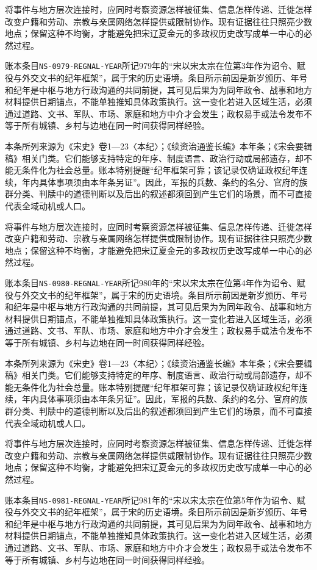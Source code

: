 将事件与地方层次连接时，应同时考察资源怎样被征集、信息怎样传递、迁徙怎样改变户籍和劳动、宗教与亲属网络怎样提供或限制协作。现有证据往往只照亮少数地点；保留这种不均衡，才能避免把宋辽夏金元的多政权历史改写成单一中心的必然过程。

账本条目\texttt{NS-0979-REGNAL-YEAR}所记979年的“宋以宋太宗在位第3年作为诏令、赋役与外交文书的纪年框架”，属于宋的历史语境。条目所示前因是新岁颁历、年号和纪年是中枢与地方行政沟通的共同前提，其可见后果为为同年政令、战事和地方材料提供日期锚点，不能单独推知具体政策执行。这一变化若进入区域生活，必须通过道路、文书、军队、市场、家庭和地方中介才会发生；政权易手或法令发布不等于所有城镇、乡村与边地在同一时间获得同样经验。

本条所列来源为《宋史》卷1—23〈本纪〉；《续资治通鉴长编》本年条；《宋会要辑稿》相关门类。它们能够支持特定的年序、制度语言、政治行动或局部遗存，却不能无条件化为社会总量。账本特别提醒“纪年框架可靠；该记录仅确证政权纪年连续，年内具体事项须由本年条另证”。因此，军报的兵数、条约的名分、官府的族群分类、判牍中的道德判断以及后出的叙述都须回到产生它们的场景，而不可直接代表全域动机或人口。

将事件与地方层次连接时，应同时考察资源怎样被征集、信息怎样传递、迁徙怎样改变户籍和劳动、宗教与亲属网络怎样提供或限制协作。现有证据往往只照亮少数地点；保留这种不均衡，才能避免把宋辽夏金元的多政权历史改写成单一中心的必然过程。

账本条目\texttt{NS-0980-REGNAL-YEAR}所记980年的“宋以宋太宗在位第4年作为诏令、赋役与外交文书的纪年框架”，属于宋的历史语境。条目所示前因是新岁颁历、年号和纪年是中枢与地方行政沟通的共同前提，其可见后果为为同年政令、战事和地方材料提供日期锚点，不能单独推知具体政策执行。这一变化若进入区域生活，必须通过道路、文书、军队、市场、家庭和地方中介才会发生；政权易手或法令发布不等于所有城镇、乡村与边地在同一时间获得同样经验。

本条所列来源为《宋史》卷1—23〈本纪〉；《续资治通鉴长编》本年条；《宋会要辑稿》相关门类。它们能够支持特定的年序、制度语言、政治行动或局部遗存，却不能无条件化为社会总量。账本特别提醒“纪年框架可靠；该记录仅确证政权纪年连续，年内具体事项须由本年条另证”。因此，军报的兵数、条约的名分、官府的族群分类、判牍中的道德判断以及后出的叙述都须回到产生它们的场景，而不可直接代表全域动机或人口。

将事件与地方层次连接时，应同时考察资源怎样被征集、信息怎样传递、迁徙怎样改变户籍和劳动、宗教与亲属网络怎样提供或限制协作。现有证据往往只照亮少数地点；保留这种不均衡，才能避免把宋辽夏金元的多政权历史改写成单一中心的必然过程。

账本条目\texttt{NS-0981-REGNAL-YEAR}所记981年的“宋以宋太宗在位第5年作为诏令、赋役与外交文书的纪年框架”，属于宋的历史语境。条目所示前因是新岁颁历、年号和纪年是中枢与地方行政沟通的共同前提，其可见后果为为同年政令、战事和地方材料提供日期锚点，不能单独推知具体政策执行。这一变化若进入区域生活，必须通过道路、文书、军队、市场、家庭和地方中介才会发生；政权易手或法令发布不等于所有城镇、乡村与边地在同一时间获得同样经验。


